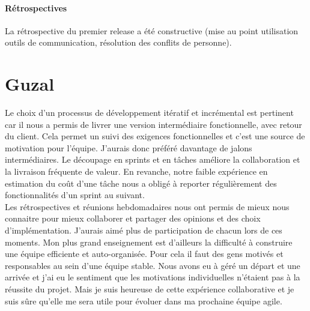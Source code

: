 \documentclass[a4paper,12pt]{article}
\begin{document}
\paragraph{Rétrospectives}
La rétrospective du premier release a été constructive (mise au point utilisation outils de communication, résolution des conflits de personne).


\section{Guzal}

Le choix d'un processus de développement itératif et incrémental est pertinent car il nous a permis de livrer une version intermédiaire fonctionnelle, avec retour du client. Cela permet un suivi des exigences fonctionnelles et c'est une source de motivation pour l'équipe. J'aurais donc préféré davantage de jalons intermédiaires.
Le découpage en sprints et en tâches améliore la collaboration et la livraison fréquente de valeur. En revanche, notre faible expérience en estimation du coût d'une tâche nous a obligé à reporter régulièrement des fonctionnalités d'un sprint au suivant.\\
Les rétrospectives et réunions hebdomadaires nous ont permis de mieux nous connaitre pour mieux collaborer et partager des opinions et des choix d'implémentation. J'aurais aimé plus de participation de chacun lors de ces moments.
Mon plus grand enseignement est d'ailleurs la difficulté à construire une équipe efficiente et auto-organisée. Pour cela il faut des gens motivés et responsables au sein d'une équipe stable. Nous avons eu à géré un départ et une arrivée et j'ai eu le sentiment que les motivations individuelles n'étaient pas à la réussite du projet. Mais je suis heureuse de cette expérience collaborative et je suis sûre qu'elle me sera utile pour évoluer dans ma prochaine équipe agile.
\end{document}
